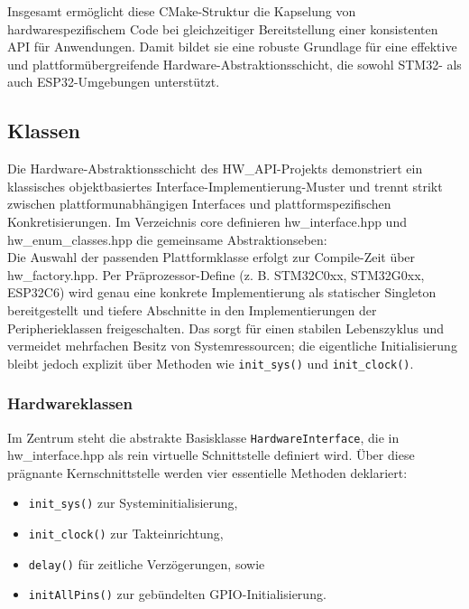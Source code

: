 Insgesamt ermöglicht diese CMake-Struktur die Kapselung von hardwarespezifischem Code bei gleichzeitiger Bereitstellung einer konsistenten API für Anwendungen. 
Damit bildet sie eine robuste Grundlage für eine effektive und plattformübergreifende Hardware-Abstraktionsschicht, die sowohl STM32- als auch ESP32-Umgebungen unterstützt.

\subsection{Klassen}
Die Hardware-Abstraktionsschicht des HW\_API-Projekts demonstriert ein klassisches objektbasiertes Interface-Implementierung-Muster und trennt strikt zwischen plattformunabhängigen Interfaces und plattformspezifischen Konkretisierungen. 
Im Verzeichnis core definieren hw\_interface.hpp und hw\_enum\_classes.hpp die gemeinsame Abstraktionseben:\\
Die Auswahl der passenden Plattformklasse erfolgt zur Compile-Zeit über hw\_factory.hpp.
Per Präprozessor-Define (z. B. STM32C0xx, STM32G0xx, ESP32C6) wird genau eine konkrete Implementierung als statischer Singleton bereitgestellt und tiefere Abschnitte in den Implementierungen der Peripherieklassen freigeschalten.
Das sorgt für einen stabilen Lebenszyklus und vermeidet mehrfachen Besitz von Systemressourcen; die eigentliche Initialisierung bleibt jedoch explizit über Methoden wie \texttt{init\_sys()} und \texttt{init\_clock()}.

\subsubsection{Hardwareklassen}
Im Zentrum steht die abstrakte Basisklasse \texttt{HardwareInterface}, die in hw\_interface.hpp als rein virtuelle Schnittstelle definiert wird. 
Über diese prägnante Kernschnittstelle werden vier essentielle Methoden deklariert:

\begin{itemize}
	\item \texttt{init\_sys()} zur Systeminitialisierung, 
	\item \texttt{init\_clock()} zur Takteinrichtung,
	\item \texttt{delay()} für zeitliche Verzögerungen, sowie 
	\item \texttt{initAllPins()} zur gebündelten GPIO-Initialisierung.
\end{itemize}

